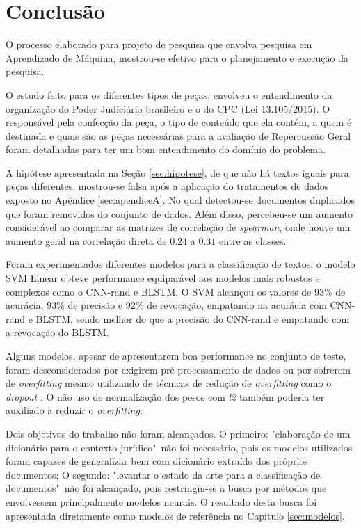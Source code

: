 \chapter{Conclusão}

O processo elaborado para projeto de pesquisa que envolva pesquisa em Aprendizado de Máquina, mostrou-se efetivo para o planejamento e execução da pesquisa.

O estudo feito para os diferentes tipos de peças, envolveu o entendimento da organização do Poder Judiciário brasileiro e o do CPC (Lei 13.105/2015). O responsável pela confecção da peça, o tipo de conteúdo que ela contém, a quem é destinada e quais são  as peças necessárias para a avaliação de Repercussão Geral foram detalhadas para ter um bom entendimento do domínio do problema.

A hipótese apresentada na Seção \ref{sec:hipotese}, de que não há textos iguais para peças diferentes, mostrou-se falsa após a aplicação do tratamentos de dados exposto no Apêndice \ref{sec:apendiceA}. No qual detectou-se documentos duplicados que foram removidos do conjunto de dados. Além disso, percebeu-se um aumento considerável ao comparar as matrizes de correlação de \textit{spearman}, onde houve um aumento geral na correlação direta de $0.24$ a $0.31$ entre as classes. 

Foram experimentados diferentes modelos para a classificação de textos, o modelo SVM Linear obteve performance equiparável aos modelos mais robustos e complexos como o CNN-rand e BLSTM. O SVM alcançou os valores de 93$\%$ de acurácia, 93$\%$ de precisão e 92$\%$ de revocação, empatando na acurácia com CNN-rand e BLSTM, sendo melhor do que a precisão do CNN-rand e empatando com a revocação do BLSTM.

Alguns modelos, apesar de apresentarem boa performance no conjunto de teste, foram desconsiderados por exigirem pré-processamento de dados ou por sofrerem de \textit{overfitting} mesmo utilizando de técnicas de redução de \textit{overfitting} como o \textit{dropout} \cite{srivastava_dropout:_2014}. O não uso de normalização dos pesos com \textit{l2} também poderia ter auxiliado a reduzir o \textit{overfitting}. 

Dois objetivos do trabalho não foram alcançados. O primeiro: "elaboração de um dicionário para o contexto jurídico"\ não foi necessário, pois os modelos utilizados foram capazes de generalizar bem com dicionário extraído dos próprios documentos; O segundo: "levantar o estado da arte para a classificação de documentos"\ não foi alcançado, pois restringiu-se a busca por métodos que envolvessem principalmente modelos neurais. O resultado desta busca foi apresentada diretamente como modelos de referência no Capítulo \ref{sec:modelos}.


